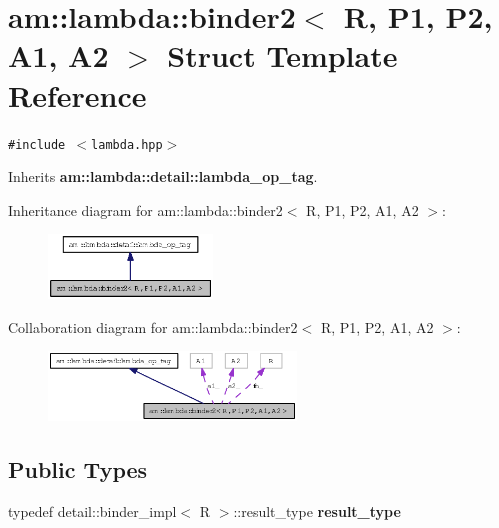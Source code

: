 \section{am::lambda::binder2$<$ R, P1, P2, A1, A2 $>$ Struct Template Reference}
\label{structam_1_1lambda_1_1binder2}
{\tt \#include $<$lambda.hpp$>$}

Inherits {\bf am::lambda::detail::lambda\_\-op\_\-tag}.

Inheritance diagram for am::lambda::binder2$<$ R, P1, P2, A1, A2 $>$:\begin{figure}[H]
\begin{center}
\leavevmode
\includegraphics[width=124pt]{structam_1_1lambda_1_1binder2__inherit__graph}
\end{center}
\end{figure}
Collaboration diagram for am::lambda::binder2$<$ R, P1, P2, A1, A2 $>$:\begin{figure}[H]
\begin{center}
\leavevmode
\includegraphics[width=187pt]{structam_1_1lambda_1_1binder2__coll__graph}
\end{center}
\end{figure}
\subsection*{Public Types}
\begin{CompactItemize}
\item 
typedef detail::binder\_\-impl$<$ R $>$::result\_\-type \textbf{result\_\-type}\label{structam_1_1lambda_1_1binder2_d73405ab552afa44c840d27cd4709304}

\end{CompactItemize}
